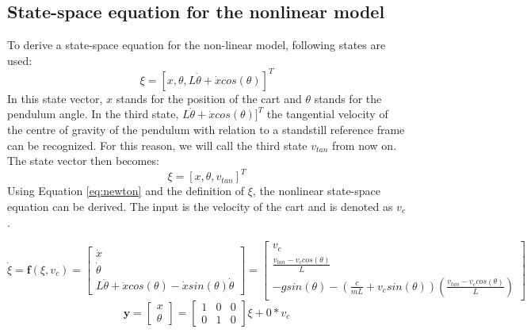 \documentclass[a4paper,kul]{kulakarticle} %
\begin{document}
\begin{figure}[htp!]
\begin{minipage}{.5\textwidth}
		\label{fig:VLDpendulum}
	\end{minipage}
\end{figure}


\subsection{State-space equation for the nonlinear model}
To derive a state-space equation for the non-linear model, following states are used:
\begin{equation}
	\xi = [x, \theta, L\dot{\theta} +  \dot{x}cos(\theta)]^{T}
\end{equation}
In this state vector, $x$ stands for the position of the cart and $\theta$ stands for the pendulum angle. In the third state, $L\dot{\theta} +  \dot{x}cos(\theta)]^{T}$ the tangential velocity of the centre of gravity of the pendulum with relation to a standstill reference frame can be recognized. For this reason, we will call the third state $v_{tan}$ from now on. The state vector then becomes: 
\begin{equation}
\xi = [x, \theta, v_{tan}]^{T}
\label{eq:xi}
\end{equation}
Using Equation \ref{eq:newton} and the definition of $\xi$, the nonlinear state-space equation can be derived. The input is the velocity of the cart and is denoted as $v_{c}$. 

\begin{equation}
	\dot{\xi} = \mathbf{f}(\xi,v_c) = \begin{bmatrix}
	\dot{x} \\ \dot{\theta} \\ L\ddot{\theta} + \ddot{x}cos(\theta) - \dot{x}sin(\theta)\dot{\theta}
	\end{bmatrix} = \begin{bmatrix}
	v_c \\ \frac{v_{tan}-v_ccos(\theta)}{L} \\ -gsin(\theta) - (\frac{c}{mL}+v_csin(\theta))(\frac{v_{tan} - v_ccos(\theta)}{L})
	\end{bmatrix}
	\label{eq:nonlinear}
\end{equation}
\begin{equation}
	\mathbf{y} 
 = \begin{bmatrix}
	 x\\\theta
 \end{bmatrix} = \begin{bmatrix}
 1&0&0\\0&1&0
 \end{bmatrix}\xi + 0*v_c
 \end{equation}
\end{document}
